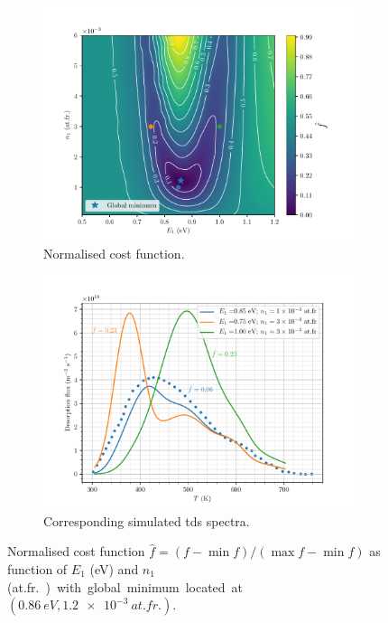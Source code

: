 \begin{figure} [h!]
    \centering
        \begin{subfigure}[t]{0.7\linewidth}
            \centering
            \includegraphics[width=\linewidth]{Figures/Chapter3/Parametric_optimisation/cost_function_2D.pdf}
            \caption{Normalised cost function.}
        \end{subfigure}
        \begin{subfigure}[t]{0.7\linewidth}
            \centering
            \includegraphics[width=\linewidth]{Figures/Chapter3/Parametric_optimisation/points_on_cost_function.pdf}
            \caption{Corresponding simulated \gls{tds} spectra.}
        \end{subfigure}%
    \caption{Normalised cost function $\hat{f} = (f - \min{f})/(\max{f}-\min{f})$ as function of $E_1$ (\si{eV}) and $n_1$ (\si{at.fr.}) with global minimum located at $(\SI{0.86}{eV}, \SI{1.2e-3}{at.fr.})$.}
    \label{fig:cost function}
\end{figure}

